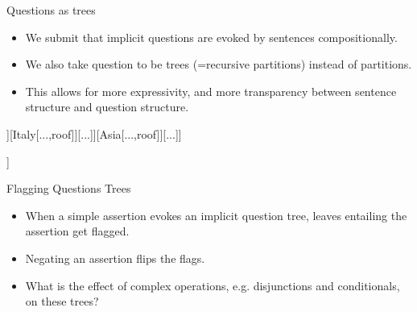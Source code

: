 \documentclass[10pt]{beamer}
\begin{document}
\begin{frame}{Questions as trees}
	\begin{minipage}{.55\linewidth}
		\begin{itemize}
			\item We submit that implicit questions are evoked by sentences compositionally.
			\item We also take question to be trees (=recursive partitions) instead of partitions.
			\item This allows for more expressivity, and more transparency between sentence structure and question structure.
		\end{itemize}
	\end{minipage}
	\hfill
	\begin{minipage}{.4\linewidth}
		\centering
		\begin{forest}
			[Jo studied in...[Europe[France[Paris][...]][Italy[...,roof]][...]][Asia[...,roof]][...]]
		\end{forest}
		\begin{forest}
			[Jo studied in...[Paris][not Paris]]
		\end{forest}
	\end{minipage}
\end{frame}

\begin{frame}{Flagging Questions Trees}
	\begin{itemize}
		\item When a simple assertion evokes an implicit question tree, leaves entailing the assertion get flagged.
		\item Negating an assertion flips the flags.
	\end{itemize}
	
	
	\begin{minipage}{.48\linewidth}
		\centering
	\end{minipage}
	\hfill
	\begin{minipage}{.48\linewidth}
		\centering
	\end{minipage}
	\begin{itemize}
		\item What is the effect of complex operations, e.g. disjunctions and conditionals, on these trees? 
	\end{itemize}
\end{frame}
\end{document}
